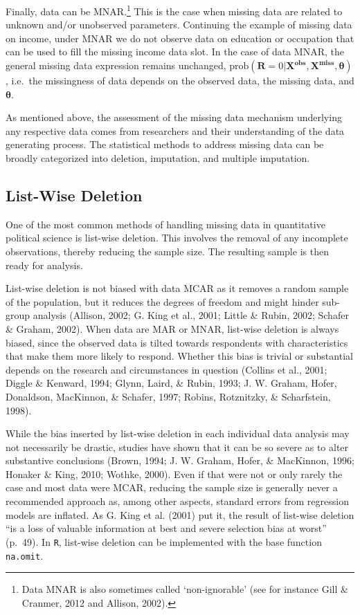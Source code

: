 \documentclass[12pt,econ]{sources/authesis}
\begin{document}
Finally, data can be MNAR.\footnote{Data MNAR is also sometimes called `non-ignorable' (see for instance Gill \& Cranmer, 2012 and Allison, 2002).} This is the case when missing data are related to unknown and/or unobserved parameters. Continuing the example of missing data on income, under MNAR we do not observe data on education or occupation that can be used to fill the missing income data slot. In the case of data MNAR, the general missing data expression remains unchanged, \(\text{prob}(\bm{R} = 0 | \bm{X^{obs}}, \bm{X^{miss}}, \bm{\theta})\), i.e.~the missingness of data depends on the observed data, the missing data, and \(\bm{\theta}\).

As mentioned above, the assessment of the missing data mechanism underlying any respective data comes from researchers and their understanding of the data generating process. The statistical methods to address missing data can be broadly categorized into deletion, imputation, and multiple imputation.

\hypertarget{ordmiss-theory-delete}{%
\subsection{List-Wise Deletion}\label{ordmiss-theory-delete}}

One of the most common methods of handling missing data in quantitative political science is list-wise deletion. This involves the removal of any incomplete observations, thereby reducing the sample size. The resulting sample is then ready for analysis.

List-wise deletion is not biased with data MCAR as it removes a random sample of the population, but it reduces the degrees of freedom and might hinder sub-group analysis (Allison, 2002; G. King et al., 2001; Little \& Rubin, 2002; Schafer \& Graham, 2002). When data are MAR or MNAR, list-wise deletion is always biased, since the observed data is tilted towards respondents with characteristics that make them more likely to respond. Whether this bias is trivial or substantial depends on the research and circumstances in question (Collins et al., 2001; Diggle \& Kenward, 1994; Glynn, Laird, \& Rubin, 1993; J. W. Graham, Hofer, Donaldson, MacKinnon, \& Schafer, 1997; Robins, Rotznitzky, \& Scharfstein, 1998).

While the bias inserted by list-wise deletion in each individual data analysis may not necessarily be drastic, studies have shown that it can be so severe as to alter substantive conclusions (Brown, 1994; J. W. Graham, Hofer, \& MacKinnon, 1996; Honaker \& King, 2010; Wothke, 2000). Even if that were not or only rarely the case and most data were MCAR, reducing the sample size is generally never a recommended approach as, among other aspects, standard errors from regression models are inflated. As G. King et al. (2001) put it, the result of list-wise deletion ``is a loss of valuable information at best and severe selection bias at worst'' (p.~49). In \texttt{R}, list-wise deletion can be implemented with the base function \texttt{na.omit}.
\end{document}
